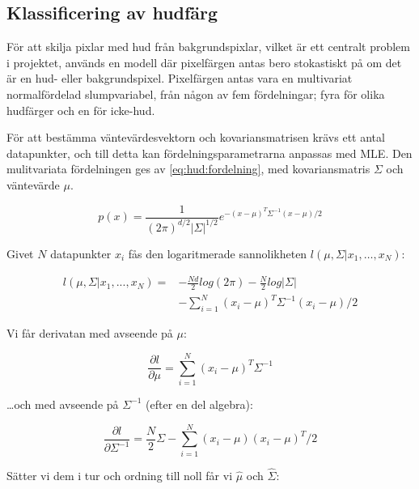 \documentclass[../rapport_MVEX01-11-05]{subfiles}
\begin{document}
\subsection{Klassificering av hudfärg}

För att skilja pixlar med hud från bakgrundspixlar, vilket är ett
centralt problem i projektet, används en modell där pixelfärgen antas
bero stokastiskt på om det är en hud- eller
bakgrundspixel. Pixelfärgen antas vara en multivariat normalfördelad
slumpvariabel, från någon av fem fördelningar; fyra för olika
hudfärger och en för icke-hud.

För att bestämma väntevärdesvektorn och kovariansmatrisen krävs ett
antal datapunkter, och till detta kan fördelningsparametrarna
anpassas med MLE. Den mulitvariata fördelningen ges av
\eqref{eq:hud:fordelning}, med kovariansmatris
$\Sigma$ och väntevärde $\mu$.


\begin{equation}
  \label{eq:hud:fordelning}
  p(x)=\frac{1}{(2\pi)^{d/2}|\Sigma|^{1/2}}e^{-(x-\mu)^T\Sigma^{-1}(x-\mu)/2}
\end{equation}

Givet $N$ datapunkter $x_i$ fås den logaritmerade sannolikheten $l(\mu,\Sigma|x_1,{\ldots} ,x_N)$:

\begin{equation}
  \label{eq:hud:logaritmerad}
  \begin{aligned}
  l(\mu,\Sigma|x_1,...,x_N) = &-\frac{Nd}{2}log(2\pi)-\frac{N}{2}log|\Sigma|\\
                              &-\sum_{i=1}^N(x_i-\mu)^T\Sigma^{-1}(x_i-\mu)/2
  \end{aligned}
\end{equation}

Vi får derivatan med avseende på $\mu$:

\begin{equation}
  \label{eq:hud:derivmu}
  \frac{\partial l}{\partial \mu}=\sum_{i=1}^N(x_i-\mu)^T\Sigma^{-1}
\end{equation}

{\ldots}och med avseende på $\Sigma^{-1}$ (efter en del algebra):

\begin{equation}
  \label{eq:hud:derivsigma}
  \frac{\partial l}{\partial \Sigma^{-1}}=\frac{N}{2}\Sigma -\sum_{i=1}^N(x_i-\mu)(x_i-\mu)^T/2
\end{equation}

Sätter vi dem i tur och ordning till noll får vi $\hat\mu$ och $\hat\Sigma$:
\end{document}
